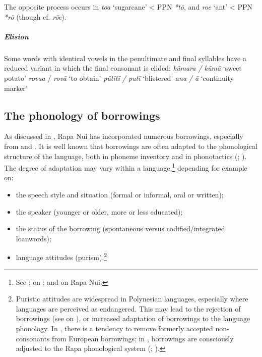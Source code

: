 The opposite process occurs in \textit{toa} ‘sugarcane’ {\textless} PPN \textit{*tō}, and \textit{roe} ‘ant’ {\textless} PPN \textit{*rō} (though cf.  \textit{rōe}).

\subparagraph{Elision} Some words with identical vowels in the penultimate and final syllables have a reduced variant in which the final consonant is elided: 
\ea
\ea
\textit{kūmara / kūmā} ‘sweet potato’
\ex
\textit{rova{\ꞌ}a} / \textit{rovā} ‘to obtain’
\ex
\textit{pūtītī / putī} ‘blistered’
\ex
\textit{{\ꞌ}ana} \textit{/ {\ꞌ}ā} ‘continuity marker’
\z
\z

\subsection{The phonology of borrowings}\label{sec:2.5.3}
As discussed in , Rapa Nui has incorporated numerous borrowings, especially from  and . It is well known that borrowings are often adapted to the phonological structure of the  language, both in phoneme inventory and in phonotactics (\citealt{TentGeraghty2004}; \citealt{MatrasSakel2007}). The degree of adaptation may vary within a language,\footnote{\label{fn:68}See \citet[17]{Sakel2007}; \citet{Mosel2004} on ; \citet{Fischer2007} and \citet{Makihara2001Adaptation} on Rapa Nui.} depending for example on:

\begin{itemize}
\item 
the speech style and situation (formal or informal, oral or written);

\item 
the speaker (younger or older, more or less educated);

\item 
the status of the borrowing (spontaneous versus codified/integrated loanwords);

\item 
language attitudes (purism).\footnote{\label{fn:69}Puristic attitudes are widespread in Polynesian languages, especially where languages are perceived as endangered. This may lead to the rejection of borrowings (see \citealt[154]{Harlow2004} on ), or increased adaptation of borrowings to the  language phonology. In , there is a tendency to remove formerly accepted non- consonants from European borrowings; in ,  borrowings are consciously adjusted to the Rapa phonological system (\citealt{KievietKieviet2006}; \citealt{Walworth2015Thesis}).}

\end{itemize}

